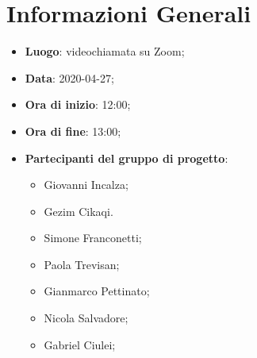 \section{Informazioni Generali}
	\begin{itemize}
		\item \textbf {Luogo}: videochiamata su Zoom;
		\item \textbf {Data}: 2020-04-27;
		\item \textbf {Ora di inizio}: 12:00;
		\item \textbf {Ora di fine}: 13:00;
		\item \textbf {Partecipanti del gruppo di progetto}:
			\begin{itemize}
				\item Giovanni Incalza;
				\item Gezim Cikaqi.
				\item Simone Franconetti;
				\item Paola Trevisan;
				\item Gianmarco Pettinato;
				\item Nicola Salvadore;
				\item Gabriel Ciulei;
			\end{itemize}
	\end{itemize}